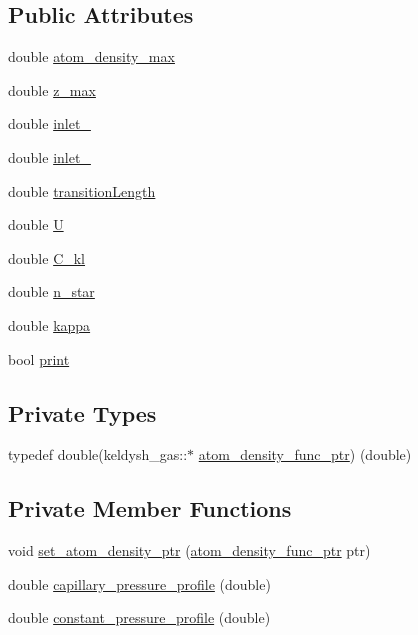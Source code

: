 \subsection*{Public Attributes}
\begin{DoxyCompactItemize}
\item 
double \hyperlink{classkeldysh__gas_a287e2c7a3081d8b65ba126288a3174bd}{atom\+\_\+density\+\_\+max}
\item 
double \hyperlink{classkeldysh__gas_a117691dd8b6fd06b34a73392c0e73e32}{z\+\_\+max}
\item 
double \hyperlink{classkeldysh__gas_ab0dee35b9ad45af3fca4a2079389e632}{inlet\+\_}
\item 
double \hyperlink{classkeldysh__gas_a685d93a796afba55c6fcd6d61c7e2bf8}{inlet\+\_}
\item 
double \hyperlink{classkeldysh__gas_a88f63ff18217c60729a67b10ee838ee4}{transition\+Length}
\item 
double \hyperlink{classkeldysh__gas_a752b70afe289a798cc0ab7b688b9ed3d}{U}
\item 
double \hyperlink{classkeldysh__gas_a7a66e438ff78b240fe419c0a426b1648}{C\+\_\+kl}
\item 
double \hyperlink{classkeldysh__gas_a22ba35c494b37c8a8e78db09d6d8748c}{n\+\_\+star}
\item 
double \hyperlink{classkeldysh__gas_a836c6a6c2f1bec80ea15344822a07ea5}{kappa}
\item 
bool \hyperlink{classkeldysh__gas_a6c8f0e275da16bbf21f51a8c2a444bf7}{print}
\end{DoxyCompactItemize}
\subsection*{Private Types}
\begin{DoxyCompactItemize}
\item 
typedef double(keldysh\+\_\+gas\+::$\ast$ \hyperlink{classkeldysh__gas_ab47ad59b466eee349a7500555869b988}{atom\+\_\+density\+\_\+func\+\_\+ptr}) (double)
\end{DoxyCompactItemize}
\subsection*{Private Member Functions}
\begin{DoxyCompactItemize}
\item 
void \hyperlink{classkeldysh__gas_a051c59204ad55298d5632ac2eb4dd626}{set\+\_\+atom\+\_\+density\+\_\+ptr} (\hyperlink{classkeldysh__gas_ab47ad59b466eee349a7500555869b988}{atom\+\_\+density\+\_\+func\+\_\+ptr} ptr)
\item 
double \hyperlink{classkeldysh__gas_a9eac2e3d9a39a2358e9b6eb7f4a868c6}{capillary\+\_\+pressure\+\_\+profile} (double)
\item 
double \hyperlink{classkeldysh__gas_ad70cb5ac156d96492a164774b80e7cdc}{constant\+\_\+pressure\+\_\+profile} (double)
\end{DoxyCompactItemize}
